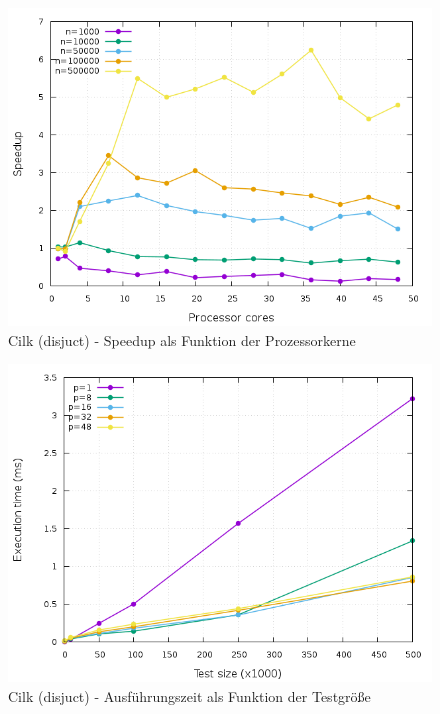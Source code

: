 \begin{figure}[p]
	\centering
	\includegraphics[width=404pt]{resources/plots/Cilk_Disjunct_sizes.png}
	\caption{Cilk (disjuct) - Speedup als Funktion der Prozessorkerne}
	\label{Cilk_Disjunct_sizes}
\end{figure}

\begin{figure}[p]
	\centering
	\includegraphics[width=404pt]{resources/plots/Cilk_Disjunct_cores.png}
	\caption{Cilk (disjuct) - Ausführungszeit als Funktion der Testgröße}
	\label{Cilk_Disjunct_cores}
\end{figure}

